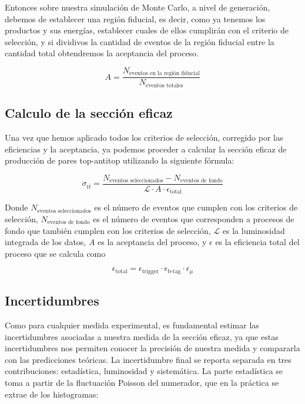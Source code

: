 \documentclass[9pt,a4paper,twocolumn,twoside]{rho-class/rho}
\begin{document}
Entonces sobre nuestra simulación de Monte Carlo, a nivel de generación, debemos de establecer una región fiducial, es decir, como ya tenemos los productos y sus energías, establecer cuales de ellos cumplirán con el criterio de selección, y si dividivos la cantidad de eventos de la región fiducial entre la cantidad total obtendremos la aceptancia del proceso.

\begin{equation}
    A = \frac{N_{\text{eventos en la región fiducial}}}{N_{\text{eventos totales}}}
\end{equation}

\subsection{Calculo de la sección eficaz}

Una vez que hemos aplicado todos los criterios de selección, corregido por las eficiencias y la aceptancia, ya podemos proceder a calcular la sección eficaz de producción de pares top-antitop utilizando la siguiente fórmula:

\begin{equation}
    \sigma_{t\bar{t}} = \frac{N_{\text{eventos seleccionados}} - N_{\text{eventos de fondo}}}{\mathcal{L} \cdot A \cdot \epsilon_{\text{total}}}
\end{equation}

Donde $N_{\text{eventos seleccionados}}$ es el número de eventos que cumplen con los criterios de selección, $N_{\text{eventos de fondo}}$ es el número de eventos que corresponden a procesos de fondo que también cumplen con los criterios de selección, $\mathcal{L}$ es la luminosidad integrada de los datos, $A$ es la aceptancia del proceso, y $\epsilon$ es la eficiencia total del proceso que se calcula como

\begin{equation}
    \epsilon_{\text{total}} = \epsilon_{\text{trigger}} \cdot \epsilon_{\text{b-tag}} \cdot \epsilon_{\mu}
\end{equation}

\subsection{Incertidumbres}

Como para cualquier medida experimental, es fundamental estimar las incertidumbres asociadas a nuestra medida de la sección eficaz, ya que estas incertidumbres nos permiten conocer la precisión de nuestra medida y compararla con las predicciones teóricas. La incertidumbre final se reporta separada en tres contribuciones: estadística, luminosidad y sistemática. La parte estadística se toma a partir de la fluctuación Poisson del numerador, que en la práctica se extrae de los histogramas:
\end{document}
